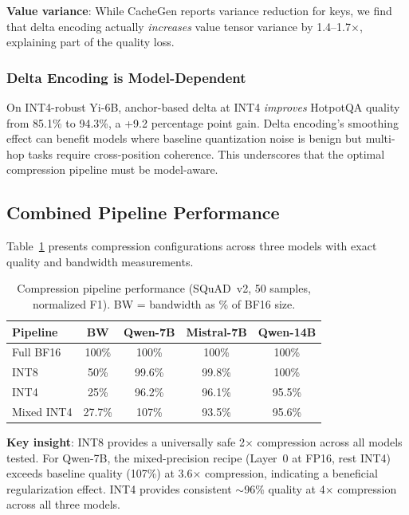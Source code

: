 \documentclass[conference]{IEEEtran}
\begin{document}
\textbf{Value variance}: While CacheGen reports variance reduction for keys, we find that delta encoding actually \emph{increases} value tensor variance by 1.4--1.7$\times$, explaining part of the quality loss.

\subsubsection{Delta Encoding is Model-Dependent}

On INT4-robust Yi-6B, anchor-based delta at INT4 \emph{improves} HotpotQA quality from 85.1\% to 94.3\%, a +9.2 percentage point gain.
Delta encoding's smoothing effect can benefit models where baseline quantization noise is benign but multi-hop tasks require cross-position coherence.
This underscores that the optimal compression pipeline must be model-aware.


\subsection{Combined Pipeline Performance}

Table~\ref{tab:combined} presents compression configurations across three models with exact quality and bandwidth measurements.

\begin{table}[t]
\centering
\caption{Compression pipeline performance (SQuAD~v2, 50 samples, normalized F1). BW = bandwidth as \% of BF16 size.}
\label{tab:combined}
\small
\begin{tabular}{@{}lcccc@{}}
\toprule
\textbf{Pipeline} & \textbf{BW} & \textbf{Qwen-7B} & \textbf{Mistral-7B} & \textbf{Qwen-14B} \\
\midrule
Full BF16        & 100\%  & 100\%  & 100\%  & 100\% \\
INT8             & 50\%   & 99.6\% & 99.8\% & 100\% \\
INT4             & 25\%   & 96.2\% & 96.1\% & 95.5\% \\
Mixed INT4       & 27.7\% & 107\%  & 93.5\% & 95.6\% \\
\bottomrule
\end{tabular}
\end{table}

\textbf{Key insight}: INT8 provides a universally safe 2$\times$ compression across all models tested.
For Qwen-7B, the mixed-precision recipe (Layer~0 at FP16, rest INT4) exceeds baseline quality (107\%) at 3.6$\times$ compression, indicating a beneficial regularization effect.
INT4 provides consistent $\sim$96\% quality at 4$\times$ compression across all three models.
\end{document}
